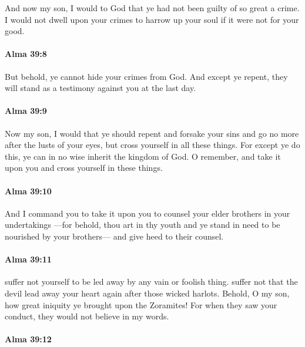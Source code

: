 			And now my son, I would to God that ye had not been guilty of so great a crime.
			I would not dwell upon your crimes to harrow up your soul
			if it were not for your good.

		\paragraph{Alma 39:8} %
			\label{ALMA-39-8}

			But behold, ye cannot hide your crimes from God.
			And except ye repent,
			they will stand as a testimony against you at the last day.

		\paragraph{Alma 39:9} %
			\label{ALMA-39-9}

			Now my son, I would that ye should repent and forsake your sins
			and go no more after the lusts of your eyes,
			but cross yourself in all these things.
			For except ye do this, ye can in no wise inherit the kingdom of God.
			O remember, and take it upon you
			and cross yourself in these things.

		\paragraph{Alma 39:10} %
			\label{ALMA-39-10}

			And I command you to take it upon you
			to counsel your elder brothers in your undertakings
			---for behold, thou art in thy youth
			and ye stand in need to be nourished by your brothers---
			and give heed to their counsel.

		\paragraph{Alma 39:11} %
			\label{ALMA-39-11}

			suffer not yourself to be led away by any vain or foolish thing.
			suffer not that the devil lead away your heart again after those wicked harlots.
			Behold, O my son, how great iniquity ye brought upon the Zoramites!
			For when they saw your conduct,
			they would not believe in my words.

		\paragraph{Alma 39:12} %
			\label{ALMA-39-12}

